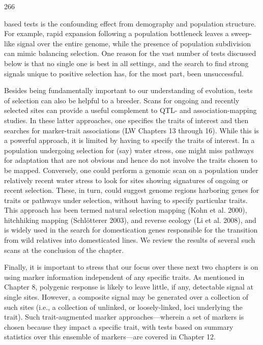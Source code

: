 \documentclass{article}
\begin{document}
266

based tests is the confounding effect from demography and population structure. For example, rapid expansion following a population bottleneck leaves a sweep-like signal over the entire genome, while the presence of population subdivision can mimic balancing selection. One reason for the vast number of tests discussed below is that no single one is best in all settings, and the search to find strong signals unique to positive selection has, for the most part, been unsuccessful.

Besides being fundamentally important to our understanding of evolution, tests of selection can also be helpful to a breeder. Scans for ongoing and recently selected sites can provide a useful complement to QTL- and association-mapping studies. In these latter approaches, one specifies the traits of interest and then searches for marker-trait associations (LW Chapters 13 through 16). While this is a powerful approach, it is limited by having to specify the traits of interest. In a population undergoing selection for (say) water stress, one might miss pathways for adaptation that are not obvious and hence do not involve the traits chosen to be mapped. Conversely, one could perform a genomic scan on a population under relatively recent water stress to look for sites showing signatures of ongoing or recent selection. These, in turn, could suggest genome regions harboring genes for traits or pathways under selection, without having to specify particular traits. This approach has been termed natural selection mapping (Kohn et al. 2000), hitchhiking mapping (Schlötterer 2003), and reverse ecology (Li et al. 2008), and is widely used in the search for domestication genes responsible for the transition from wild relatives into domesticated lines. We review the results of several such scans at the conclusion of the chapter.

Finally, it is important to stress that our focus over these next two chapters is on using marker information independent of any specific traits. As mentioned in Chapter 8, polygenic response is likely to leave little, if any, detectable signal at single sites. However, a composite signal may be generated over a collection of such sites (i.e., a collection of unlinked, or loosely-linked, loci underlying the trait). Such trait-augmented marker approaches—wherein a set of markers is chosen because they impact a specific trait, with tests based on summary statistics over this ensemble of markers—are covered in Chapter 12.
\end{document}

